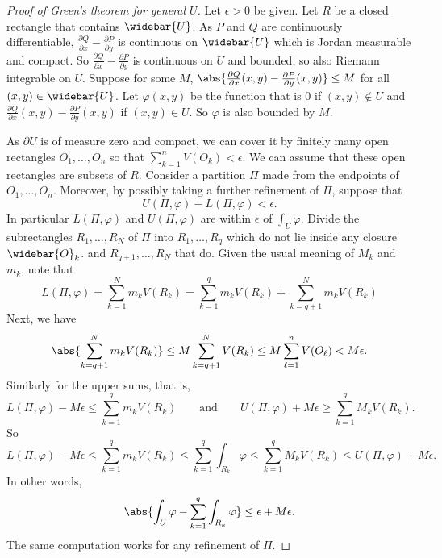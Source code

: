 
\begin{proof}[Proof of Green's theorem for general $U$]
Let $\epsilon > 0$ be given.
Let $R$ be a closed rectangle that contains $\widebar{U}$.
As $P$ and $Q$ are continuously differentiable,
$\frac{\partial Q}{\partial x}-\frac{\partial P}{\partial y}$
is continuous on $\widebar{U}$ which is Jordan measurable and compact.
So $\frac{\partial Q}{\partial x}-\frac{\partial P}{\partial y}$ is
continuous on $U$ and bounded, so also Riemann integrable on $U$.
Suppose for some $M$,
$\abs{\frac{\partial Q}{\partial x}(x,y)-\frac{\partial P}{\partial y}(x,y)}
\leq M$ for all $(x,y) \in \widebar{U}$.
Let $\varphi(x,y)$ be the function that is $0$ if $(x,y) \notin U$
and
$\frac{\partial Q}{\partial x}(x,y)-\frac{\partial P}{\partial y}(x,y)$
if $(x,y) \in U$.  So $\varphi$ is also bounded by $M$.

As $\partial U$ is of measure zero and compact, we can cover it by
finitely many open rectangles $O_1,\ldots,O_n$ so that
$\sum_{k=1}^n V(O_k) < \epsilon$.  We can assume that these
open rectangles are subsets of $R$.  Consider a partition $\Pi$
made from the endpoints of $O_1,\ldots,O_n$.
Moreover, by possibly taking a further refinement of $\Pi$, suppose that
\begin{equation*}
U(\Pi,\varphi)-L(\Pi,\varphi) < \epsilon .
\end{equation*}
In particular $L(\Pi,\varphi)$ and $U(\Pi,\varphi)$ are
within $\epsilon$ of $\int_U \varphi$.
Divide the subrectangles $R_1,\ldots,R_N$ of $\Pi$ into
$R_1,\ldots,R_q$ which do not lie inside any closure $\widebar{O}_k$.
and $R_{q+1},\ldots,R_N$ that do.  Given the usual meaning of $M_k$ and $m_k$,
note that
\begin{equation*}
L(\Pi,\varphi)
=
\sum_{k=1}^N m_k V(R_k)
=
\sum_{k=1}^q m_k V(R_k)
+
\sum_{k=q+1}^N m_k V(R_k)
\end{equation*}
Next, we have
\begin{equation*}
\abs{\sum_{k=q+1}^N m_k V(R_k)}
\leq
M
\sum_{k=q+1}^N V(R_k)
\leq
M
\sum_{\ell=1}^n V(O_\ell)
< M \epsilon .
\end{equation*}
Similarly for the upper sums, that is,
\begin{equation*}
L(\Pi,\varphi)-M\epsilon \leq \sum_{k=1}^q m_k V(R_k)
\qquad \text{and} \qquad
U(\Pi,\varphi)+M\epsilon \geq \sum_{k=1}^q M_k V(R_k) .
\end{equation*}
So
\begin{equation*}
L(\Pi,\varphi)
- M\epsilon
\leq
\sum_{k=1}^q m_k V(R_k)
\leq
\sum_{k=1}^q \int_{R_k} \varphi
\leq
\sum_{k=1}^q M_k V(R_k)
\leq
U(\Pi,\varphi) + M \epsilon .
\end{equation*}
In other words,
\begin{equation*}
\abs{\int_U \varphi - \sum_{k=1}^q \int_{R_k} \varphi} \leq \epsilon + M
\epsilon .
\end{equation*}
The same computation works for any refinement of $\Pi$.


\end{proof}
